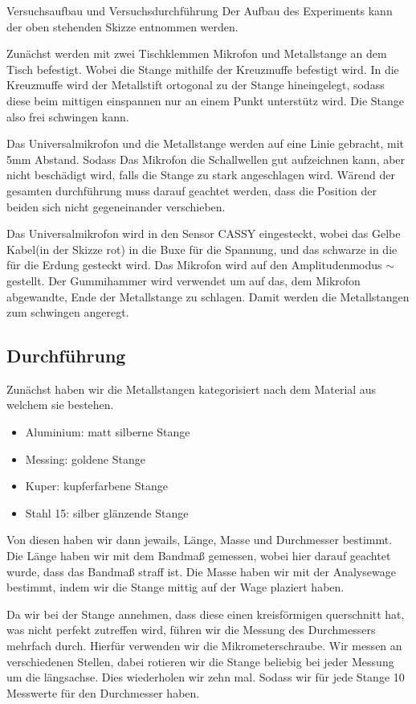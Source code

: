 \documentclass[twoside]{protokoll}
\begin{document}
\begin{aufgabe}{Versuchsaufbau und Versuchsdurchführung}
Der Aufbau des Experiments kann der oben stehenden Skizze entnommen werden. 

Zunächst werden mit zwei Tischklemmen Mikrofon und Metallstange an dem Tisch befestigt. Wobei die Stange mithilfe der Kreuzmuffe befestigt wird. In die Kreuzmuffe wird der Metallstift ortogonal zu der Stange hineingelegt, sodass diese beim mittigen einspannen nur an einem Punkt unterstütz wird. Die Stange also frei schwingen kann. 

Das Universalmikrofon und die Metallstange werden auf eine Linie gebracht, mit 5mm Abstand. Sodass Das Mikrofon die Schallwellen gut aufzeichnen kann, aber nicht beschädigt wird, falls die Stange zu stark angeschlagen wird. Wärend der gesamten durchführung muss darauf geachtet werden, dass die Position der beiden sich nicht gegeneinander verschieben. 


Das Universalmikrofon wird in den Sensor CASSY eingesteckt, wobei das Gelbe Kabel(in der Skizze rot) in die Buxe für die Spannung, und das schwarze in die für die Erdung gesteckt wird. Das Mikrofon wird auf den Amplitudenmodus $\sim$ gestellt. Der Gummihammer wird verwendet um auf das, dem Mikrofon abgewandte, Ende der Metallstange zu schlagen. Damit werden die Metallstangen zum schwingen angeregt.

\subsection{Durchführung}

Zunächst haben wir die Metallstangen kategorisiert nach dem Material aus welchem sie bestehen.

\begin{itemize}
\item Aluminium:		 matt silberne Stange 
\item Messing:		 goldene Stange
\item Kuper:			 kupferfarbene Stange
\item Stahl 15:		 silber glänzende Stange
\end{itemize}

Von diesen haben wir dann jewails, Länge, Masse und Durchmesser bestimmt. 
Die Länge haben wir mit dem Bandmaß gemessen, wobei hier darauf geachtet wurde, dass das Bandmaß straff ist. Die Masse haben wir mit der Analysewage bestimmt, indem wir die Stange mittig auf der Wage plaziert haben. 


Da wir bei der Stange annehmen, dass diese einen kreisförmigen querschnitt hat, was nicht perfekt zutreffen wird, führen wir die Messung des Durchmessers mehrfach durch. Hierfür verwenden wir die Mikrometerschraube. Wir messen an verschiedenen Stellen, dabei rotieren wir die Stange beliebig bei jeder Messung um die längsachse. Dies wiederholen wir zehn mal. Sodass wir für jede Stange 10 Messwerte für den Durchmesser haben.\\ 


\end{aufgabe}
\end{document}

